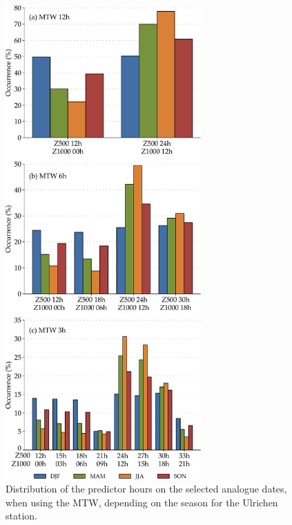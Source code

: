 \documentclass[hess, manuscript]{copernicus}
\begin{document}
	\begin{figure}[htb]
		\includegraphics[width=7.5cm]{fig11.pdf}
		\caption{Distribution of the predictor hours on the selected analogue dates, when using the MTW, depending on the season for the Ulrichen station.}
		\label{fig:hours_selection_per_season}
	\end{figure}
	
\end{document}

